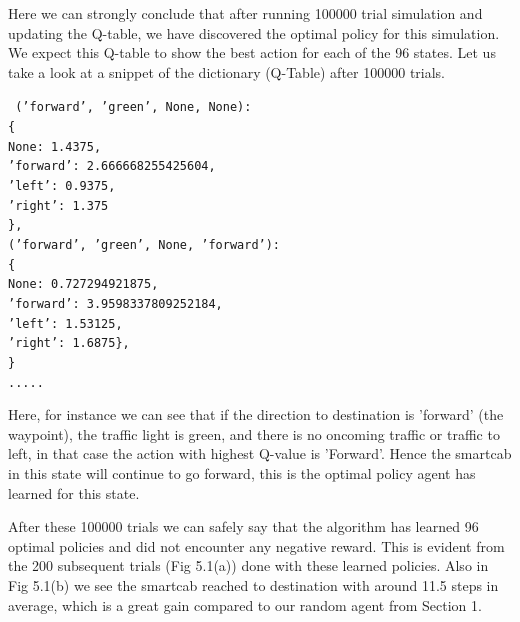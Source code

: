 \documentclass[paper=a4, fontsize=11pt]{scrartcl}
\newcommand\tab[1][1cm]{\hspace*{#1}}
\numberwithin{equation}{section}		%
\numberwithin{figure}{section}			%
\numberwithin{table}{section}				%
\begin{document}
Here we can strongly conclude that after running 100000 trial simulation and updating the Q-table, we have discovered the optimal policy for this simulation. We expect this Q-table to show the best action for each of the 96 states. Let us take a look at a snippet of the dictionary (Q-Table) after 100000 trials. 

\texttt{ 
	\tab ('forward', 'green', None, None):\\
	\tab\tab	 \{\\
	\tab\tab\tab	None: 1.4375,\\
	\tab\tab\tab	'forward': 2.666668255425604,\\
	\tab\tab\tab	'left': 0.9375,\\
	\tab\tab\tab	'right': 1.375\\
	\tab\tab	 \},\\
	\tab ('forward', 'green', None, 'forward'):\\ 
	\tab\tab	\{\\
	\tab\tab\tab	None: 0.727294921875,\\
	\tab\tab\tab    'forward': 3.9598337809252184,\\
	\tab\tab\tab	'left': 1.53125,\\
	\tab\tab\tab	'right': 1.6875\},\\
	\tab\tab	\}\\	
	\tab\tab	.....\\
}

Here, for instance we can see that if the direction to destination is 'forward' (the waypoint), the traffic light is green, and there is no oncoming traffic or traffic to left, in that case the action with highest Q-value is 'Forward'. Hence the smartcab in  this state will continue to go forward, this is the optimal policy agent has learned for this state. 

After these 100000 trials we can safely say that the algorithm has learned 96 optimal policies and did not encounter any negative reward. This is evident from the 200 subsequent trials (Fig 5.1(a)) done with these learned policies. Also in Fig 5.1(b) we see the smartcab reached to destination with around 11.5 steps in average, which is a great gain compared to our random agent from Section 1.
 
 
 
\end{document}
